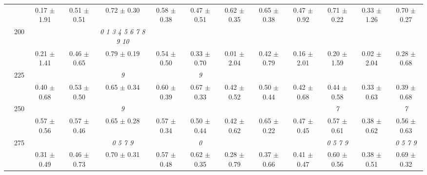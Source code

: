 \begin{table}[h]
{\begin{tabular}{
        ccccccccccccc}
 & & \cellcolor[HTML]{EFEFEF} 0.17 $\pm$ 1.91& \cellcolor[HTML]{EFEFEF} 0.51 $\pm$ 0.51& \cellcolor[HTML]{EFEFEF} 0.72 $\pm$ 0.30& \cellcolor[HTML]{EFEFEF} 0.58 $\pm$ 0.38& \cellcolor[HTML]{EFEFEF} 0.47 $\pm$ 0.51& \cellcolor[HTML]{EFEFEF} 0.62 $\pm$ 0.35& \cellcolor[HTML]{EFEFEF} 0.65 $\pm$ 0.38& \cellcolor[HTML]{EFEFEF} 0.47 $\pm$ 0.92& \cellcolor[HTML]{EFEFEF} 0.71 $\pm$ 0.22& \cellcolor[HTML]{EFEFEF} 0.33 $\pm$ 1.26& \cellcolor[HTML]{EFEFEF} 0.70 $\pm$ 0.27 \\ 
 & \multirow{2}{*}{200}& & & \textit{  0  1  3  4  5  6  7  8  9 10 }& & & & & & & &  \\ 
 & & 0.21 $\pm$ 1.41& 0.46 $\pm$ 0.65& 0.79 $\pm$ 0.19& 0.54 $\pm$ 0.50& 0.33 $\pm$ 0.70& 0.01 $\pm$ 2.04& 0.42 $\pm$ 0.79& 0.16 $\pm$ 2.01& 0.20 $\pm$ 1.59& 0.02 $\pm$ 2.04& 0.28 $\pm$ 0.68 \\ 
 & \multirow{2}{*}{225}& \cellcolor[HTML]{EFEFEF} & \cellcolor[HTML]{EFEFEF} & \cellcolor[HTML]{EFEFEF} \textit{ 9 }& \cellcolor[HTML]{EFEFEF} & \cellcolor[HTML]{EFEFEF} \textit{ 9 }& \cellcolor[HTML]{EFEFEF} & \cellcolor[HTML]{EFEFEF} & \cellcolor[HTML]{EFEFEF} & \cellcolor[HTML]{EFEFEF} & \cellcolor[HTML]{EFEFEF} & \cellcolor[HTML]{EFEFEF}  \\ 
 & & \cellcolor[HTML]{EFEFEF} 0.40 $\pm$ 0.68& \cellcolor[HTML]{EFEFEF} 0.53 $\pm$ 0.50& \cellcolor[HTML]{EFEFEF} 0.65 $\pm$ 0.34& \cellcolor[HTML]{EFEFEF} 0.60 $\pm$ 0.39& \cellcolor[HTML]{EFEFEF} 0.67 $\pm$ 0.33& \cellcolor[HTML]{EFEFEF} 0.42 $\pm$ 0.52& \cellcolor[HTML]{EFEFEF} 0.50 $\pm$ 0.44& \cellcolor[HTML]{EFEFEF} 0.42 $\pm$ 0.68& \cellcolor[HTML]{EFEFEF} 0.44 $\pm$ 0.58& \cellcolor[HTML]{EFEFEF} 0.33 $\pm$ 0.63& \cellcolor[HTML]{EFEFEF} 0.39 $\pm$ 0.68 \\ 
 & \multirow{2}{*}{250}& & & \textit{ 9 }& & & & & & \textit{ 7 }& & \textit{ 7 } \\ 
 & & 0.57 $\pm$ 0.56& 0.57 $\pm$ 0.46& 0.65 $\pm$ 0.28& 0.57 $\pm$ 0.34& 0.50 $\pm$ 0.44& 0.42 $\pm$ 0.62& 0.65 $\pm$ 0.22& 0.47 $\pm$ 0.45& 0.57 $\pm$ 0.61& 0.38 $\pm$ 0.62& 0.56 $\pm$ 0.63 \\ 
 & \multirow{2}{*}{275}& \cellcolor[HTML]{EFEFEF} & \cellcolor[HTML]{EFEFEF} & \cellcolor[HTML]{EFEFEF} \textit{ 0 5 7 9 }& \cellcolor[HTML]{EFEFEF} & \cellcolor[HTML]{EFEFEF} \textit{ 0 }& \cellcolor[HTML]{EFEFEF} & \cellcolor[HTML]{EFEFEF} & \cellcolor[HTML]{EFEFEF} & \cellcolor[HTML]{EFEFEF} \textit{ 0 5 7 9 }& \cellcolor[HTML]{EFEFEF} & \cellcolor[HTML]{EFEFEF} \textit{ 0 5 7 9 } \\ 
 & & \cellcolor[HTML]{EFEFEF} 0.31 $\pm$ 0.49& \cellcolor[HTML]{EFEFEF} 0.46 $\pm$ 0.73& \cellcolor[HTML]{EFEFEF} 0.70 $\pm$ 0.31& \cellcolor[HTML]{EFEFEF} 0.57 $\pm$ 0.48& \cellcolor[HTML]{EFEFEF} 0.62 $\pm$ 0.35& \cellcolor[HTML]{EFEFEF} 0.28 $\pm$ 0.79& \cellcolor[HTML]{EFEFEF} 0.37 $\pm$ 0.66& \cellcolor[HTML]{EFEFEF} 0.41 $\pm$ 0.47& \cellcolor[HTML]{EFEFEF} 0.60 $\pm$ 0.56& \cellcolor[HTML]{EFEFEF} 0.38 $\pm$ 0.51& \cellcolor[HTML]{EFEFEF} 0.69 $\pm$ 0.32 \\ 

\end{tabular}}
\end{table}
